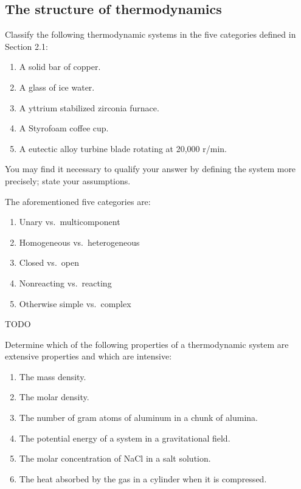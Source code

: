 \begin{@empty}
\section{The structure of thermodynamics}
\begin{problem}
    Classify the following thermodynamic systems in the five categories defined
    in Section 2.1:
    \begin{enumerate}
        \item A solid bar of copper.
        \item A glass of ice water.
        \item A yttrium stabilized zirconia furnace.
        \item A Styrofoam coffee cup.
        \item A eutectic alloy turbine blade rotating at 20,000 r/min.
    \end{enumerate}

    You may find it necessary to qualify your answer by defining the system
    more precisely; state your assumptions.
\end{problem}

\begin{remark}
    \renewcommand{\theenumi}{\arabic{enumi}}
    The aforementioned five categories are:
    \begin{enumerate}
        \item Unary vs.\ multicomponent
        \item Homogeneous vs.\ heterogeneous
        \item Closed vs.\ open
        \item Nonreacting vs.\ reacting
        \item Otherwise simple vs.\ complex
    \end{enumerate}
\end{remark}

\begin{answer}
    TODO
\end{answer}

\begin{problem}
\end{problem}

\begin{problem}
    Determine which of the following properties of a thermodynamic system are
    extensive properties and which are intensive:
    \begin{enumerate}
        \item The mass density.
        \item The molar density.
        \item The number of gram atoms of aluminum in a chunk of alumina.
        \item The potential energy of a system in a gravitational field.
        \item The molar concentration of NaCl in a salt solution.
        \item The heat absorbed by the gas in a cylinder when it is compressed.
    \end{enumerate}
\end{problem}


\end{@empty}
